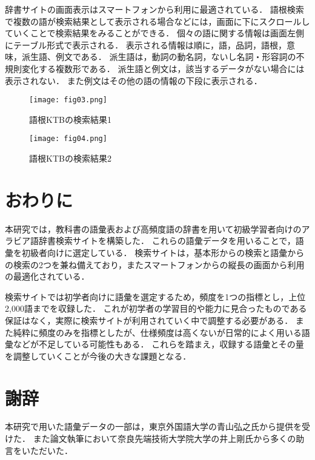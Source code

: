 \documentclass[technicalreport]{ieicej}
\begin{document}
辞書サイトの画面表示はスマートフォンから利用に最適されている．
語根検索で複数の語が検索結果として表示される場合などには，画面に下にスクロールしていくことで検索結果をみることができる．
個々の語に関する情報は画面左側にテーブル形式で表示される．
表示される情報は順に，語，品詞，語根，意味，派生語、例文である．
派生語は，動詞の動名詞，ないし名詞・形容詞の不規則変化する複数形である．
派生語と例文は，該当するデータがない場合には表示されない．
また例文はその他の語の情報の下段に表示される．

\begin{figure}[H]
 \begin{minipage}{0.5\hsize}
  \begin{center}
   \texttt{[image: fig03.png]}
  \end{center}
  \caption{語根KTBの検索結果1}
 \end{minipage}
 \begin{minipage}{0.5\hsize}
  \begin{center}
   \texttt{[image: fig04.png]}
  \end{center}
  \caption{語根KTBの検索結果2}
 \end{minipage}
\end{figure}

\section{おわりに}
本研究では，教科書の語彙表\cite{aoyama2015}および高頻度語の辞書\cite{buckwalter2009}を用いて初級学習者向けのアラビア語辞書検索サイトを構築した．
これらの語彙データを用いることで，語彙を初級者向けに選定している．
検索サイトは，基本形からの検索と語彙からの検索の2つを兼ね備えており，またスマートフォンからの縦長の画面から利用の最適化されている．

検索サイトでは初学者向けに語彙を選定するため，頻度を1つの指標とし，上位2,000語までを収録した．
これが初学者の学習目的や能力に見合ったものである保証はなく，実際に検索サイトが利用されていく中で調整する必要がある．
また純粋に頻度のみを指標としたが、仕様頻度は高くないが日常的によく用いる語彙などが不足している可能性もある．
これらを踏まえ，収録する語彙とその量を調整していくことが今後の大きな課題となる．

\section{謝辞}
本研究で用いた語彙データの一部は，東京外国語大学の青山弘之氏から提供を受けた．
また論文執筆において奈良先端技術大学院大学の井上剛氏から多くの助言をいただいた．
\end{document}
